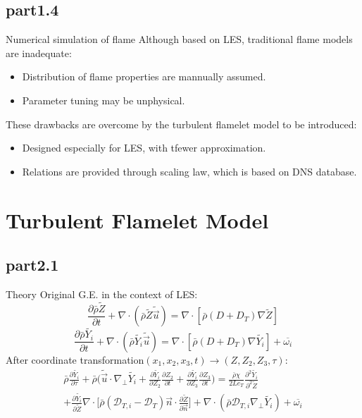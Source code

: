 	\subsection{part1.4}
		\begin{xframe}{Numerical simulation of flame}
			Although based on LES, traditional flame models are inadequate:
			\begin{itemize}
				\item
					Distribution of flame properties are mannually assumed.
				\item
					Parameter tuning may be unphysical.
			\end{itemize}
			These drawbacks are overcome by the turbulent flamelet model to be introduced:
			\begin{itemize}
				\item
					Designed especially for LES, with tfewer approximation.
				\item
					Relations are provided through scaling law, which is based on DNS database\cite{RN2}.
			\end{itemize}		
		\end{xframe}
\section{Turbulent Flamelet Model}
	\subsection{part2.1}
		\begin{xframe}{Theory}
			Original G.E. in the context of LES:
			\begin{equation}
				\frac{\partial \bar{\rho}\tilde{Z}}{\partial t} + \nabla \cdot (\bar{\rho} \tilde{Z}\tilde{\vec{u}}) = \nabla \cdot [\bar{\rho}(D+D_T)\nabla\tilde{Z}]
			\end{equation}
			\begin{equation}
				\frac{\partial \bar{\rho}\tilde{Y_i}}{\partial t} + \nabla \cdot (\bar{\rho} \tilde{Y_i}\tilde{\vec{u}}) = \nabla \cdot [\bar{\rho}(D+D_T)\nabla\tilde{Y_i}] + \overline{\omega_i}
			\end{equation}
			After coordinate transformation$(x_1,x_2,x_3,t)\rightarrow(Z,Z_2,Z_3,\tau)$:
			\begin{equation}
				\begin{split}
					\bar{\rho}\frac{\partial \tilde{Y_i}}{\partial \tau} + \bar{\rho} \Big(\tilde{\vec{u}} \cdot \nabla_\perp \tilde{Y_i} + \frac{\partial \tilde{Y_i}}{\partial Z_2}\frac{\partial Z_2}{\partial t} + \frac{\partial \tilde{Y_i}}{\partial Z_3}\frac{\partial Z_3}{\partial t}\Big) = \frac{\bar{\rho}\chi}{2Le_T}\frac{\partial^2 \tilde{Y_i}}{\partial^2 \tilde{Z}}\\ + \frac{\partial \tilde{Y_i}}{\partial \tilde{Z}}\nabla\cdot\Bigg[\bar{\rho}(\mathcal{D}_{T,i}-\mathcal{D}_T)\vec{n}\cdot\frac{\partial \tilde{Z}}{\partial \vec{n}}\Bigg] + \nabla \cdot (\bar{\rho}\mathcal{D}_{T,i}\nabla_\perp\tilde{Y_i}) + \overline{\omega_i}
				\end{split}	
			\end{equation}
		\end{xframe}
